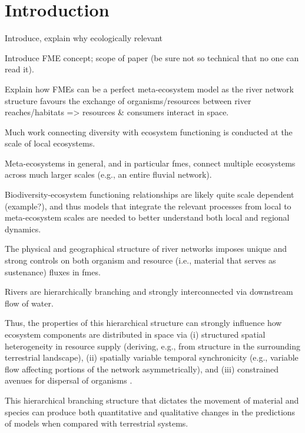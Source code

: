 \section{Introduction}

\begin{itemize}
    {Introduce, explain why ecologically relevant}
    
		{Introduce FME concept; scope of paper (be sure not so technical that no one can read it). 
		
		Explain how FMEs can be a perfect meta-ecosystem model as the river network structure favours the exchange of organisms/resources between river reaches/habitats => resources \& consumers interact in space.
		
		Much work connecting diversity with ecosystem functioning is conducted at the scale of local ecosystems.
		
		Meta-ecosystems in general, and in particular \acp{fme}, connect multiple ecosystems across much larger scales (e.g., an entire fluvial network).
		
		Biodiversity-ecosystem functioning relationships are likely quite scale dependent \autocite{Gonzalez2020} (example?), and thus models that integrate the relevant processes from local to meta-ecosystem scales are needed to better understand both local and regional dynamics.}
		
		{The physical and geographical structure of river networks imposes unique and strong controls on both organism and resource (i.e., material that serves as sustenance)  fluxes in \acp{fme}.
		
		Rivers are hierarchically branching and strongly interconnected via downstream flow of water.
		
		Thus, the properties of this hierarchical structure can strongly influence how ecosystem components are distributed in space via (i) structured spatial heterogeneity in resource supply (deriving, e.g., from structure in the surrounding terrestrial landscape), (ii) spatially variable temporal synchronicity (e.g., variable flow affecting portions of the network asymmetrically), and (iii) constrained avenues for dispersal of organisms \autocite{Helton2018,BENDA2004,Heino2015}.
		
		This hierarchical branching structure that dictates the movement of material and species can produce both quantitative and qualitative changes in the predictions of models when compared with terrestrial systems. 
		
}
\end{itemize}
